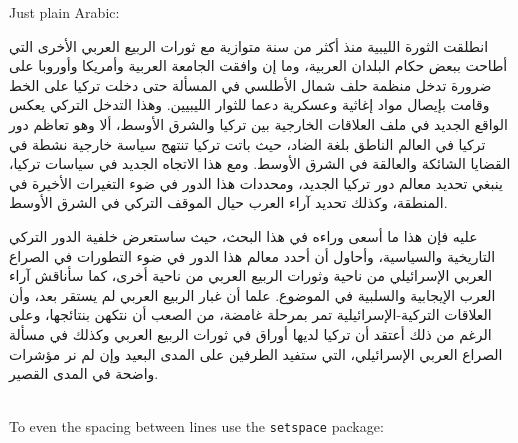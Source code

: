 \documentclass{article}
\begin{document}
Just plain Arabic:
\ \\

\begin{Arabic}

انطلقت الثورة الليبية منذ أكثر من سنة متوازية مع ثورات الربيع العربي الأخرى التي أطاحت ببعض حكام البلدان العربية، وما إن وافقت الجامعة العربية وأمريكا وأوروبا على ضرورة تدخل منظمة حلف شمال الأطلسي في المسألة حتى دخلت تركيا على الخط وقامت بإيصال مواد إغاثية وعسكرية دعما للثوار الليبيين. وهذا التدخل التركي يعكس الواقع الجديد في ملف العلاقات الخارجية بين تركيا والشرق الأوسط، ألا وهو تعاظم دور تركيا في العالم الناطق بلغة الضاد، حيث باتت تركيا تنتهج سياسة خارجية نشطة في القضايا الشائكة والعالقة في الشرق الأوسط. ومع هذا الاتجاه الجديد في سياسات تركيا، ينبغي تحديد معالم دور تركيا الجديد، ومحددات هذا الدور في ضوء التغيرات الأخيرة في المنطقة، وكذلك تحديد آراء العرب حيال الموقف التركي في الشرق الأوسط.

عليه فإن هذا ما أسعى وراءه في هذا البحث، حيث ساستعرض خلفية الدور التركي التاريخية والسياسية، وأحاول أن أحدد معالم هذا الدور في ضوء التطورات في الصراع العربي الإسرائيلي من ناحية وثورات الربيع العربي من ناحية أخرى، كما سأناقش آراء العرب الإيجابية والسلبية في الموضوع. علما أن غبار الربيع العربي لم يستقر بعد، وأن العلاقات التركية-الإسرائيلية تمر بمرحلة غامضة، من الصعب أن نتكهن بنتائجها، وعلى الرغم من ذلك أعتقد أن تركيا لديها أوراق في ثورات الربيع العربي وكذلك في مسألة الصراع العربي الإسرائيلي، التي ستفيد الطرفين على المدى البعيد وإن لم نر مؤشرات واضحة في المدى القصير.

\end{Arabic}
\ \\

To even the spacing between lines use the \verb|setspace| package:
\ \\
\end{document}
